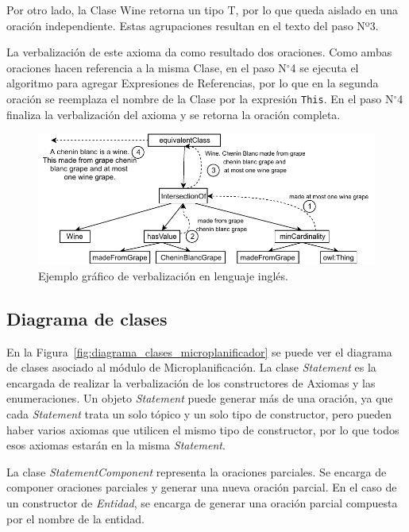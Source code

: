 Por otro lado, la Clase Wine retorna un tipo T, por lo que queda aislado en una oración independiente. Estas agrupaciones resultan en el texto del paso Nº3.

La verbalización de este axioma da como resultado dos oraciones. Como ambas oraciones hacen referencia a la misma Clase, en el paso N$^\circ$4  se ejecuta el algoritmo para agregar Expresiones de Referencias, por lo que en la segunda oración se reemplaza el nombre de la Clase por la expresión \texttt{This}. En el paso N$^\circ$4 finaliza la verbalización del axioma y se retorna la oración completa.

\begin{figure}
    \centering
    \includegraphics[width=\textwidth]{img/generacion_documento/verbalizacion_equivalentClass_english.pdf}
    \caption{Ejemplo gráfico de verbalización en lenguaje inglés.}
    \label{fig:ejemplo_verb_ingles}
\end{figure}

\subsection{Diagrama de clases}
En la Figura~\ref{fig:diagrama_clases_microplanificador} se puede ver el diagrama de clases asociado al módulo de Microplanificación. 
La clase \emph{Statement} es la encargada de realizar la verbalización de los constructores de Axiomas y las enumeraciones. Un objeto \emph{Statement} puede generar más de una oración, ya que cada \emph{Statement} trata un solo tópico y un solo tipo de constructor, pero pueden haber varios axiomas que utilicen el mismo tipo de constructor, por lo que todos esos axiomas estarán en la misma \emph{Statement}.

La clase \emph{StatementComponent} representa la oraciones parciales. Se encarga de componer oraciones parciales y generar una nueva oración parcial. En el caso de un constructor de \textit{Entidad}, se encarga de generar una oración parcial compuesta por el nombre de la entidad.

